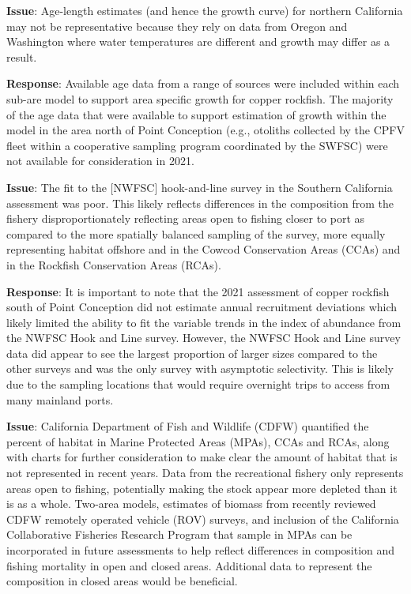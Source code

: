 \documentclass[11pt,
  english,
  letterpaper,
]{article}
\begin{document}
\textbf{Issue}: Age-length estimates (and hence the growth curve) for northern California may not be representative because they rely on data from Oregon and Washington where water temperatures are different and growth may differ as a result.

\textbf{Response}: Available age data from a range of sources were included within each sub-are model to support area specific growth for copper rockfish. The majority of the age data that were available to support estimation of growth within the model in the area north of Point Conception (e.g., otoliths collected by the CPFV fleet within a cooperative sampling program coordinated by the SWFSC) were not available for consideration in 2021.

\textbf{Issue}: The fit to the {[}NWFSC{]} hook-and-line survey in the Southern California assessment was poor. This likely reflects differences in the composition from the fishery disproportionately reflecting areas open to fishing closer to port as compared to the more spatially balanced sampling of the survey, more equally representing habitat offshore and in the Cowcod Conservation Areas (CCAs) and in the Rockfish Conservation Areas (RCAs).

\textbf{Response}: It is important to note that the 2021 assessment of copper rockfish south of Point Conception did not estimate annual recruitment deviations which likely limited the ability to fit the variable trends in the index of abundance from the NWFSC Hook and Line survey. However, the NWFSC Hook and Line survey data did appear to see the largest proportion of larger sizes compared to the other surveys and was the only survey with asymptotic selectivity. This is likely due to the sampling locations that would require overnight trips to access from many mainland ports.

\textbf{Issue}: California Department of Fish and Wildlife (CDFW) quantified the percent of habitat in Marine Protected Areas (MPAs), CCAs and RCAs, along with charts for further consideration to make clear the amount of habitat that is not represented in recent years. Data from the recreational fishery only represents areas open to fishing, potentially making the stock appear more depleted than it is as a whole. Two-area models, estimates of biomass from recently reviewed CDFW remotely operated vehicle (ROV) surveys, and inclusion of the California Collaborative Fisheries Research Program that sample in MPAs can be incorporated in future assessments to help reflect differences in composition and fishing mortality in open and closed areas. Additional data to represent the composition in closed areas would be beneficial.
\end{document}
